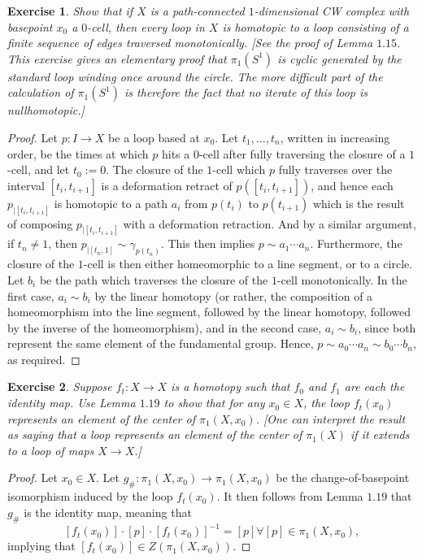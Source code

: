 \documentclass{article}
\newtheorem{exercise}{Exercise}[subsection]
\begin{document}
\begin{exercise}
Show that if $X$ is a path-connected $1$-dimensional CW complex with basepoint $x_0$ a $0$-cell, then every loop in $X$ is homotopic to a loop consisting of a finite sequence of edges traversed monotonically. [See the proof of Lemma $1.15$. This exercise gives an elementary proof that $\pi_1(S^1)$ is cyclic generated by the standard loop winding once around the circle. The more difficult part of the calculation of $\pi_1(S^1)$ is therefore the fact that no iterate of this loop is nullhomotopic.]
\end{exercise}
\begin{proof}
Let $p:I\to X$ be a loop based at $x_0$. Let $t_1,\dots,t_n$, written in increasing order, be the times at which $p$ hits a $0$-cell after fully traversing the closure of a $1$-cell, and let $t_0:=0 $. The closure of the $1$-cell which $p$ fully traverses over the interval $[t_i,t_{i+1}]$ is a deformation retract of $p([t_i,t_{i+1}])$, and hence each $p_{|[t_i,t_{i+1}]}$ is homotopic to a path $a_i$ from $p(t_i)$ to $p(t_{i+1})$ which is the result of composing $p_{|[t_i,t_{i+1}]}$ with a deformation retraction. And by a similar argument, if $t_n\neq1$, then $p_{|[t_n,1]}\sim\gamma_{p(t_n)}$. This then implies $p\sim a_1\cdots a_n$. Furthermore, the closure of the $1$-cell is then either homeomorphic to a line segment, or to a circle. Let $b_i$ be the path which traverses the closure of the $1$-cell monotonically. In the first case, $a_i\sim b_i$ by the linear homotopy (or rather, the composition of a homeomorphism into the line segment, followed by the linear homotopy, followed by the inverse of the homeomorphism), and in the second case, $a_i\sim b_i$, since both represent the same element of the fundamental group. Hence, $p\sim a_0\cdots a_n\sim b_0\cdots b_n$, as required.
\end{proof}

\begin{exercise}
Suppose $f_t:X\to X$ is a homotopy such that $f_0$ and $f_1$ are each the identity map. Use Lemma $1.19$ to show that for any $x_0\in X$, the loop $f_t(x_0)$ represents an element of the center of $\pi_1(X,x_0)$. [One can interpret the result as saying that a loop represents an element of the center of $\pi_1(X)$ if it extends to a loop of maps $X\to X$.]
\end{exercise}
\begin{proof}
Let $x_0\in X$. Let $g_\#:\pi_1(X,x_0)\to\pi_1(X,x_0)$ be the change-of-basepoint isomorphism induced by the loop $f_t(x_0)$. It then follows from Lemma $1.19$ that $g_\#$ is the identity map, meaning that \[[f_t(x_0)]\cdot [p]\cdot[f_t(x_0)]^{-1}=[p]\forall[p]\in\pi_1(X,x_0),\] implying that $[f_t(x_0)]\in Z(\pi_1(X,x_0))$.
\end{proof}
\end{document}
